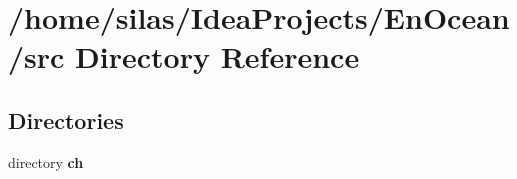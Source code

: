 \section{/home/silas/\+Idea\+Projects/\+En\+Ocean/src Directory Reference}
\label{dir_68267d1309a1af8e8297ef4c3efbcdba}
\subsection*{Directories}
\begin{DoxyCompactItemize}
\item 
directory {\bf ch}
\end{DoxyCompactItemize}
